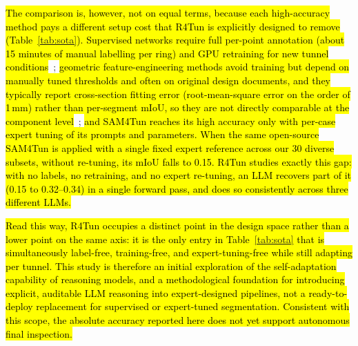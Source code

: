 \documentclass[a4paper,fleqn]{cas-dc}
\newcommand{\hlcite}[1]{\hl{\cite{#1}}}
\begin{document}
{\hl{The comparison is, however, not on equal terms, because each high-accuracy method pays a different setup cost that R4Tun is explicitly designed to remove (Table~\ref{tab:sota}). Supervised networks require full per-point annotation (about 15 minutes of manual labelling per ring) and GPU retraining for new tunnel conditions}~\hlcite{lin2024seg2tunnel}; \hl{geometric feature-engineering methods avoid training but depend on manually tuned thresholds and often on original design documents, and they typically report cross-section fitting error (root-mean-square error on the order of 1\,mm) rather than per-segment mIoU, so they are not directly comparable at the component level}~\hlcite{fischler1981ransac,weidner2024generalized}; \hl{and SAM4Tun reaches its high accuracy only with per-case expert tuning of its prompts and parameters. When the same open-source SAM4Tun is applied with a single fixed expert reference across our 30 diverse subsets, without re-tuning, its mIoU falls to 0.15. R4Tun studies exactly this gap: with no labels, no retraining, and no expert re-tuning, an LLM recovers part of it (0.15 to 0.32--0.34) in a single forward pass, and does so consistently across three different LLMs.}

\hl{Read this way, R4Tun occupies a distinct point in the design space rather than a lower point on the same axis: it is the only entry in Table~\ref{tab:sota} that is simultaneously label-free, training-free, and expert-tuning-free while still adapting per tunnel. This study is therefore an initial exploration of the self-adaptation capability of reasoning models, and a methodological foundation for introducing explicit, auditable LLM reasoning into expert-designed pipelines, not a ready-to-deploy replacement for supervised or expert-tuned segmentation. Consistent with this scope, the absolute accuracy reported here does not yet support autonomous final inspection.}

}
\end{document}
